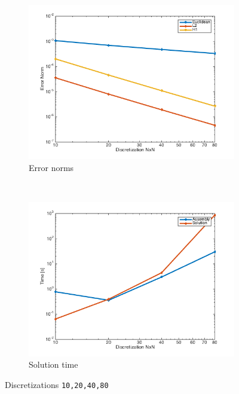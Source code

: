 \documentclass[unicode,11pt,a4paper,oneside,numbers=endperiod,openany]{scrartcl}
\begin{document}
\begin{figure}
    \centering
    \begin{subfigure}[b]{0.48\textwidth}
        \includegraphics[width=\textwidth]{../FEMerror}
        \caption{Error norms}
        \label{fig:gull}
    \end{subfigure}
    ~ %
    \begin{subfigure}[b]{0.48\textwidth}
        \includegraphics[width=\textwidth]{../FEMtime}
        \caption{Solution time}
        \label{fig:tiger}
    \end{subfigure}
    \caption{Discretizations \texttt{10,20,40,80}}\label{fig:animals}
\end{figure}
\end{document}
